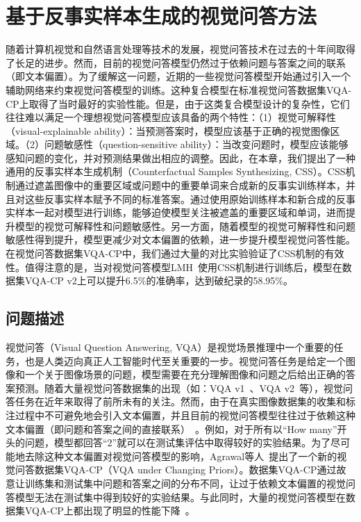 \chapter{基于反事实样本生成的视觉问答方法}

随着计算机视觉和自然语言处理等技术的发展，视觉问答技术在过去的十年间取得了长足的进步。然而，目前的视觉问答模型仍然过于依赖问题与答案之间的联系（即文本偏置）。为了缓解这一问题，近期的一些视觉问答模型开始通过引入一个辅助网络来约束视觉问答模型的训练。这种复合模型在标准视觉问答数据集VQA-CP上取得了当时最好的实验性能。但是，由于这类复合模型设计的复杂性，它们往往难以满足一个理想视觉问答模型应该具备的两个特性：（1）视觉可解释性（visual-explainable ability）：当预测答案时，模型应该基于正确的视觉图像区域。（2）问题敏感性（question-sensitive ability）：当改变问题时，模型应该能够感知问题的变化，并对预测结果做出相应的调整。因此，在本章，我们提出了一种通用的反事实样本生成机制（Counterfactual Samples Synthesizing, CSS）。CSS机制通过遮盖图像中的重要区域或问题中的重要单词来合成新的反事实训练样本，并且对这些反事实样本赋予不同的标准答案。通过使用原始训练样本和新合成的反事实样本一起对模型进行训练，能够迫使模型关注被遮盖的重要区域和单词，进而提升模型的视觉可解释性和问题敏感性。另一方面，随着模型的视觉可解释性和问题敏感性得到提升，模型更减少对文本偏置的依赖，进一步提升模型视觉问答性能。在视觉问答数据集VQA-CP中，我们通过大量的对比实验验证了CSS机制的有效性。值得注意的是，当对视觉问答模型LMH~\cite{clark2019don}使用CSS机制进行训练后，模型在数据集VQA-CP v2上可以提升6.5\%的准确率，达到破纪录的58.95\%。

\section{问题描述} \label{ch7:sec:introduction}
视觉问答（Visual Question Answering, VQA）是视觉场景推理中一个重要的任务，也是人类迈向真正人工智能时代至关重要的一步。视觉问答任务是给定一个图像和一个关于图像场景的问题，模型需要在充分理解图像和问题之后给出正确的答案预测。随着大量视觉问答数据集的出现（如：VQA v1~\cite{antol2015vqa}、VQA v2~\cite{goyal2017making}等），视觉问答任务在近年来取得了前所未有的关注。然而，由于在真实图像数据集的收集和标注过程中不可避免地会引入文本偏置，并且目前的视觉问答模型往往过于依赖这种文本偏置（即问题和答案之间的直接联系）~\cite{agrawal2016analyzing,zhang2016yin,johnson2017clevr,goyal2017making}。例如，对于所有以“How many”开头的问题，模型都回答“2”就可以在测试集评估中取得较好的实验结果。为了尽可能地去除这种文本偏置对视觉问答模型的影响，Agrawal等人~\cite{agrawal2018don}提出了一个新的视觉问答数据集VQA-CP（VQA under Changing Priors）。数据集VQA-CP通过故意让训练集和测试集中问题和答案之间的分布不同，让过于依赖文本偏置的视觉问答模型无法在测试集中得到较好的实验结果。与此同时，大量的视觉问答模型在数据集VQA-CP上都出现了明显的性能下降~\cite{andreas2016neural,fukui2016multimodal,yang2016stacked,anderson2018bottom}。

